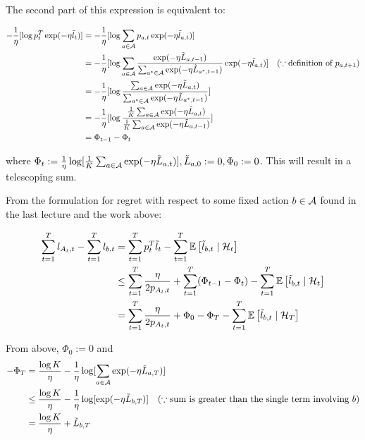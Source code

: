 \documentclass[11pt]{article}
\begin{document}
The second part of this expression is equivalent to: 

\begin{align*}
-\frac{1}{\eta} [\log p_t^T \exp (-\eta \tilde l_t)] &= -\frac{1}{\eta} [\log \sum_{a \in \mathcal{A}} p_{a, t} \exp (-\eta \tilde l_{a,t})] \\
&= -\frac{1}{\eta} [\log \sum_{a \in \mathcal{A}} \frac{\exp (-\eta \tilde L_{a, t-1})}{\sum_{a^* \in \mathcal{A}} \exp (-\eta \tilde L_{a^*, t-1})} \exp(-\eta \tilde l_{a,t})] ~~~ (\because \text{definition of } p_{a, t+1}) \\
&= -\frac{1}{\eta} [\log \frac{\sum_{a \in \mathcal{A}} \exp(-\eta \tilde L_{a,t})}{\sum_{a^* \in \mathcal{A}} \exp(-\eta \tilde L_{a^*, t-1})}] \\
&= -\frac{1}{\eta} [\log \frac{\frac{1}{K}\sum_{a \in \mathcal{A}} \exp(-\eta \tilde L_{a,t})}{\frac{1}{K}\sum_{a \in \mathcal{A}} \exp(-\eta \tilde L_{a, t-1})}] \\
&= \Phi_{t-1} - \Phi_{t} \\
\end{align*}

where $\Phi_t := \frac{1}{\eta} \log[\frac{1}{K} \sum_{a \in \mathcal{A}} \exp(-\eta \tilde L_{a,t})], \tilde L_{a,0} := 0, \Phi_0 :=0$.  This will result in a telescoping sum.

From the formulation for regret with respect to some fixed action $b \in \mathcal{A}$ found in the last lecture and the work above:

\begin{align*}
\sum_{t=1}^T l_{A_t, t} - \sum_{t=1}^T l_{b,t} &= \sum_{t=1}^T p_t^T \tilde l_t - \sum_{t=1}^T \mathbb{E}\left[ \tilde l_{b, t} \mid \mathcal{H}_t \right]  \\
&\leq \sum_{t=1}^T \frac{\eta}{2 p_{A_t, t}} + \sum_{t=1}^T (\Phi_{t-1} - \Phi_{t}) - \sum_{t=1}^T \mathbb{E}\left[ \tilde l_{b,t} \mid \mathcal{H}_{t} \right] \\
&= \sum_{t=1}^T \frac{\eta}{2 p_{A_t, t}} + \Phi_0 - \Phi_T -\sum_{t=1}^T \mathbb{E}\left[ \tilde l_{b,t}\mid\mathcal{H}_T \right]
\end{align*}

From above, $\Phi_0 := 0$ and 
\begin{align*}
-\Phi_T &= \frac{\log K}{\eta} -\frac{1}{\eta} \log[\sum_{a \in \mathcal{A}} \exp( -\eta \tilde L_{a,T})] \\
&\leq \frac{\log K}{\eta} -\frac{1}{\eta} \log[\exp(-\eta \tilde L_{b, T})] ~~~ (\because \text{sum is greater than the single term involving $b$}) \\
&= \frac{\log K}{\eta} + \tilde L_{b,T}
\end{align*}
\end{document}

